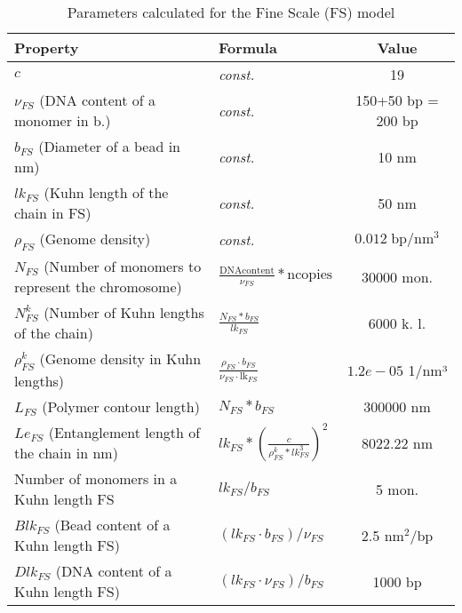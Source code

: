 
\begin{table}[H]

\begin{tabular}{|l|l|c|}
\hline
\textbf{Property} & \textbf{Formula} & \textbf{Value}\\
\hline
\textbf{$c$} & \textit{const.} & 19\\
\hline
\textbf{$\nu_{FS}$} (DNA content of a monomer in b.) & \textit{const.} & 150+50 bp = 200 bp\\
\hline
\textbf{$b_{FS}$} (Diameter of a bead in nm) & \textit{const.} & 10 nm\\
\hline
\textbf{$lk_{FS}$} (Kuhn length of the chain  in FS) & \textit{const.} & 50 nm \\
\hline
\textbf{$\rho_{FS}$} (Genome density) &\textit{const.} & $0.012\; \text{bp}/\text{nm}^3$ \\ %
\hline
\textbf{$N_{FS}$} (Number of monomers to represent the chromosome) & $\frac{\text{DNAcontent}}{\nu_{FS}} * \text{ncopies}$ & 30000 mon.\\
\hline
\textbf{$N^k_{FS}$} (Number of Kuhn lengths of the chain) & $\frac{N_{FS} * b_{FS}}{lk_{FS}}$ & 6000 k. l.\\
\hline
\textbf{$\rho^k_{FS}$} (Genome density in Kuhn lengths) & $\frac{\rho_{FS} \cdot b_{FS}}{\nu_{FS} \cdot \text{lk}_{FS}}$& $1.2e-05$ 1/nm³\\
\hline
\textbf{$L_{FS}$} (Polymer contour length) & $N_{FS} * b_{FS}$ & 300000 nm\\
\hline
\textbf{$Le_{FS}$} (Entanglement length of the chain in nm) & $lk_{FS} * \left(\frac{c}{\rho^k_{FS} * lk_{FS}^3}\right)^2$ & 8022.22 nm\\
\hline
Number of monomers in a Kuhn length FS & $lk_{FS}/b_{FS}$ & 5 mon.\\
\hline
$Blk_{FS}$ (Bead content of a Kuhn length FS) & $(lk_{FS} \cdot b_{FS})/\nu_{FS}$ & 2.5 $\text{nm}^2$/bp  \\
\hline
$Dlk_{FS}$ (DNA content of a Kuhn length FS) & $(lk_{FS} \cdot \nu_{FS})/b_{FS}$ & 1000 $\text{bp}$\\
\hline
\end{tabular}
\label{tab: parameters FS}
\caption{Parameters calculated for the Fine Scale (FS) model}
\end{table}



